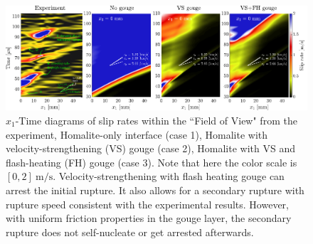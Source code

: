 \documentclass[final,a4paper]{elsarticle}
\newif\ifincludetext
\begin{document}
\ifincludetext{
As a comparison between the experiment and the simulation cases with pure Homalite (no gouge), 
velocity-strengthening gouge and velocity-strengthening gouge further equipped with flash heating effect, 
Figure~\ref{fig:EXPHMVSFH} shows the slip rate within the experimental ``Field of View" at $x_3 = 0\ \mathrm{mm}$. 
We observe that with uniform Homalite and gouge friction properties, 
we are able to reproduce the arrival and arrest of the first rupture propagation around $40\ \mathrm{\mu s}$. 
Further with velocity-strengthening plus flash heating gouge friction properties, 
we are able to obtain a secondary rupture that has the same slip rate as the experiment. 
However, 
the second rupture arrives from the Homalite zone and is not self-contained, 
as in the experiment. 
}
\fi

\begin{figure}[htbp]
    \centering
    \includegraphics[width=1.\textwidth]{figures/EXP_HMOnly_VSNOFH_VSFH.pdf}
    \caption{$x_1$-Time diagrams of slip rates within the ``Field of View" from the experiment, Homalite-only interface (case 1), Homalite with velocity-strengthening (VS) gouge (case 2), Homalite with VS and flash-heating (FH) gouge (case 3). 
    Note that here the color scale is $[0, 2]\ \mathrm{m/s}$. 
    Velocity-strengthening with flash heating gouge can arrest the initial rupture. 
    It also allows for a secondary rupture with rupture speed consistent with the experimental results. 
    However, 
    with uniform friction properties in the gouge layer, 
    the secondary rupture does not self-nucleate or get arrested afterwards.}
    \label{fig:EXPHMVSFH}
\end{figure}
\end{document}
